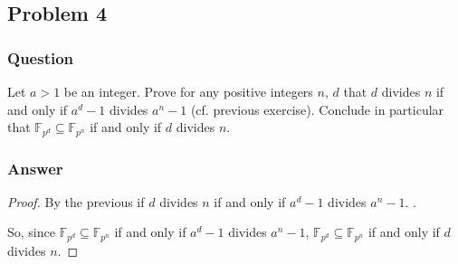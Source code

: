 \documentclass[10pt]{article}
\begin{document}
\subsection{Problem 4}
\subsubsection{Question}
Let $a>1$ be an integer. Prove for any positive integers $n$, $d$ that $d$ divides $n$ if and only if $a^d-1$ divides $a^n-1$ (cf. previous exercise). Conclude in particular that $\mathbb{F}_{p^d} \subseteq \mathbb{F}_{p^n}$ if and only if $d$ divides $n$.
\subsubsection{Answer}
\begin{proof}
By the previous if $d$ divides $n$ if and only if $a^d-1$ divides $a^n-1$. .

So, since $\mathbb{F}_{p^d} \subseteq \mathbb{F}_{p^n}$ if and only if $a^d-1$ divides $a^n-1$, $\mathbb{F}_{p^d} \subseteq \mathbb{F}_{p^n}$ if and only if $d$ divides $n$.
\end{proof}
\end{document}
